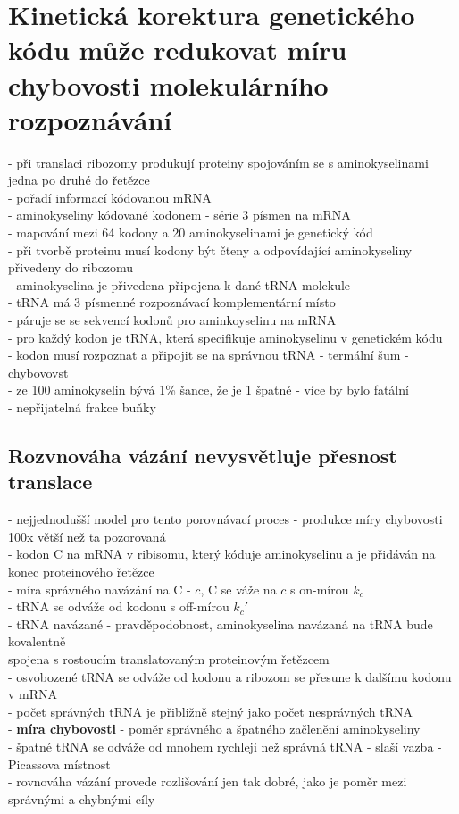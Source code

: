\documentclass[11pt,a4paper]{report}
\begin{document}
\section{Kinetická korektura genetického kódu může redukovat míru chybovosti molekulárního rozpoznávání}
- při translaci ribozomy produkují proteiny spojováním se s aminokyselinami jedna po druhé do řetězce\\
\indent - pořadí informací kódovanou mRNA\\
\indent - aminokyseliny kódované kodonem - série 3 písmen na mRNA\\
\indent - mapování mezi 64 kodony a 20 aminokyselinami je genetický kód\\
- při tvorbě proteinu musí kodony být čteny a odpovídající aminokyseliny přivedeny do ribozomu\\
\indent - aminokyselina je přivedena připojena k dané tRNA molekule\\
\indent - tRNA má 3 písmenné rozpoznávací komplementární místo\\
\indent \indent - páruje se se sekvencí kodonů pro aminkoyselinu na mRNA\\
\indent \indent - pro každý kodon je tRNA, která specifikuje aminokyselinu v genetickém kódu\\
- kodon musí rozpoznat a připojit se na správnou tRNA - termální šum - chybovovst\\
\indent - ze 100 aminokyselin bývá 1\% šance, že je 1 špatně - více by bylo fatální\\
\indent \indent - nepřijatelná frakce buňky\\

\subsection{Rozvnováha vázání nevysvětluje přesnost translace}
- nejjednodušší model pro tento porovnávací proces - produkce míry chybovosti 100x větší než ta pozorovaná\\
- kodon C na mRNA v ribisomu, který kóduje aminokyselinu a je přidáván na konec proteinového řetězce\\
\indent - míra správného navázání na C - $c$, C se váže na $c$ s on-mírou $k_c$\\
\indent - tRNA se odváže od kodonu s off-mírou $k_c'$\\
\indent - tRNA navázané - pravděpodobnost, aminokyselina navázaná na tRNA bude kovalentně\\
\indent \indent spojena s rostoucím translatovaným proteinovým řetězcem\\
\indent - osvobozené tRNA se odváže od kodonu a ribozom se přesune k dalšímu kodonu v mRNA\\
\indent - počet správných tRNA je přibližně stejný jako počet nesprávných tRNA\\
\indent - \textbf{míra chybovosti} - poměr správného a špatného začlenění aminokyseliny\\
\indent - špatné tRNA se odváže od mnohem rychleji než správná tRNA - slaší vazba - Picassova místnost\\
- rovnováha vázání provede rozlišování jen tak dobré, jako je poměr mezi správnými a chybnými cíly\\
\end{document}
